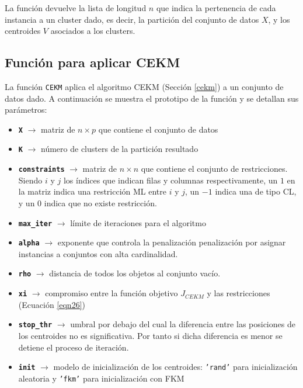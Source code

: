 La función devuelve la lista de longitud $n$ que indica la pertenencia de cada instancia a un cluster dado, es decir, la partición del conjunto de datos $X$, y los centroides $V$ asociados a los clusters.

\subsection{Función para aplicar CEKM}

La función \texttt{CEKM} aplica el algoritmo \acs{CEKM} (Sección \ref{cekm}) a un conjunto de datos dado. A continuación se muestra el prototipo de la función y se detallan sus parámetros:


\begin{itemize}
	
	\item \textbf{\texttt{X}} {$\longrightarrow$ matriz de $n \times p$ que contiene el conjunto de datos}
	
	\item \textbf{\texttt{K}} {$\longrightarrow$ número de clusters de la partición resultado}
	
	\item \textbf{\texttt{constraints}} {$\longrightarrow$ matriz de $n \times n$ que contiene el conjunto de restricciones. Siendo $i$ y $j$ los índices que indican filas y columnas respectivamente, un $1$ en la matriz indica una restricción \acs{ML} entre $i$ y $j$, un $-1$ indica una de tipo \acs{CL}, y un $0$ indica que no existe restricción.}
	
	\item \textbf{\texttt{max\_iter}} {$\longrightarrow$ límite de iteraciones para el algoritmo}
	
	\item \textbf{\texttt{alpha}} {$\longrightarrow$ exponente que controla la penalización penalización por asignar instancias a conjuntos con alta cardinalidad.}
	
	\item \textbf{\texttt{rho}} {$\longrightarrow$ distancia de todos los objetos al conjunto vacío.}
	
	\item \textbf{\texttt{xi}} {$\longrightarrow$ compromiso entre la función objetivo $J_{CEKM}$ y las restricciones (Ecuación \ref{eqn26})}
	
	\item \textbf{\texttt{stop\_thr}} {$\longrightarrow$ umbral por debajo del cual la diferencia entre las posiciones de los centroides no es significativa. Por tanto si dicha diferencia es menor se detiene el proceso de iteración.}
	
	\item \textbf{\texttt{init}} {$\longrightarrow$ modelo de inicialización de los centroides: \texttt{'rand'} para inicialización aleatoria y \texttt{'fkm'} para inicialización con \acf{FKM}}
	
\end{itemize}

